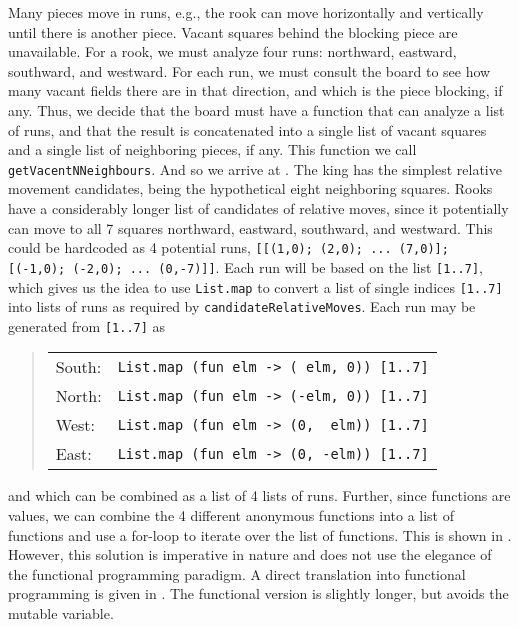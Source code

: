 Many pieces move in runs, e.g., the rook can move horizontally and vertically until there is another piece. Vacant squares behind the blocking piece are unavailable. For a rook, we must analyze four runs: northward, eastward, southward, and westward. For each run, we must consult the board to see how many vacant fields there are in that direction, and which is the piece blocking, if any. Thus, we decide that the board must have a function that can analyze a list of runs, and that the result is concatenated into a single list of vacant squares and a single list of neighboring pieces, if any. This function we call \lstinline{getVacentNNeighbours}. And so we arrive at .
%
%
The king has the simplest relative movement candidates, being the hypothetical eight neighboring squares. Rooks have a considerably longer list of candidates of relative moves, since it potentially can move to all 7 squares northward, eastward, southward, and westward. This could be hardcoded as 4 potential runs, \lstinline{[[(1,0); (2,0); ... (7,0)]; [(-1,0); (-2,0); ... (0,-7)]]}. Each run will be based on the list \lstinline{[1..7]}, which gives us the idea to use \lstinline{List.map} to convert a list of single indices \lstinline{[1..7]} into lists of runs as required by \lstinline{candidateRelativeMoves}. Each run may be generated from \lstinline{[1..7]} as
\begin{quote}
  \begin{tabular}{ll}
    South:& \lstinline!List.map (fun elm -> ( elm, 0)) [1..7]! \\
    North:& \lstinline!List.map (fun elm -> (-elm, 0)) [1..7]!  \\
    West:& \lstinline!List.map (fun elm -> (0,  elm)) [1..7]! \\
    East:& \lstinline!List.map (fun elm -> (0, -elm)) [1..7]! 
  \end{tabular}
\end{quote}
and which can be combined as a list of 4 lists of runs. Further, since functions are values, we can combine the 4 different anonymous functions into a list of functions and use a for-loop to iterate over the list of functions. This is shown in .
%
%
However, this solution is imperative in nature and does not use the elegance of the functional programming paradigm. A direct translation into functional programming is given in .
%
%
The functional version is slightly longer, but avoids the mutable variable.

